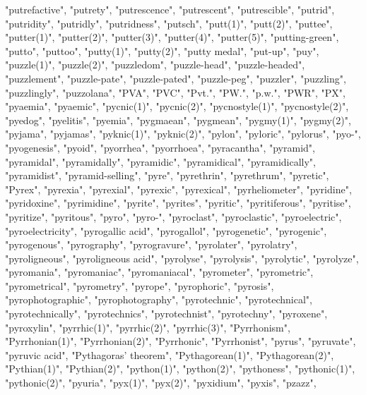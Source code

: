 "putrefactive",
"putrety",
"putrescence",
"putrescent",
"putrescible",
"putrid",
"putridity",
"putridly",
"putridness",
"putsch",
"putt(1)",
"putt(2)",
"puttee",
"putter(1)",
"putter(2)",
"putter(3)",
"putter(4)",
"putter(5)",
"putting-green",
"putto",
"puttoo",
"putty(1)",
"putty(2)",
"putty medal",
"put-up",
"puy",
"puzzle(1)",
"puzzle(2)",
"puzzledom",
"puzzle-head",
"puzzle-headed",
"puzzlement",
"puzzle-pate",
"puzzle-pated",
"puzzle-peg",
"puzzler",
"puzzling",
"puzzlingly",
"puzzolana",
"PVA",
"PVC",
"Pvt.",
"PW.",
"p.w.",
"PWR",
"PX",
"pyaemia",
"pyaemic",
"pycnic(1)",
"pycnic(2)",
"pycnostyle(1)",
"pycnostyle(2)",
"pyedog",
"pyelitis",
"pyemia",
"pygmaean",
"pygmean",
"pygmy(1)",
"pygmy(2)",
"pyjama",
"pyjamas",
"pyknic(1)",
"pyknic(2)",
"pylon",
"pyloric",
"pylorus",
"pyo-",
"pyogenesis",
"pyoid",
"pyorrhea",
"pyorrhoea",
"pyracantha",
"pyramid",
"pyramidal",
"pyramidally",
"pyramidic",
"pyramidical",
"pyramidically",
"pyramidist",
"pyramid-selling",
"pyre",
"pyrethrin",
"pyrethrum",
"pyretic",
"Pyrex",
"pyrexia",
"pyrexial",
"pyrexic",
"pyrexical",
"pyrheliometer",
"pyridine",
"pyridoxine",
"pyrimidine",
"pyrite",
"pyrites",
"pyritic",
"pyritiferous",
"pyritise",
"pyritize",
"pyritous",
"pyro",
"pyro-",
"pyroclast",
"pyroclastic",
"pyroelectric",
"pyroelectricity",
"pyrogallic acid",
"pyrogallol",
"pyrogenetic",
"pyrogenic",
"pyrogenous",
"pyrography",
"pyrogravure",
"pyrolater",
"pyrolatry",
"pyroligneous",
"pyroligneous acid",
"pyrolyse",
"pyrolysis",
"pyrolytic",
"pyrolyze",
"pyromania",
"pyromaniac",
"pyromaniacal",
"pyrometer",
"pyrometric",
"pyrometrical",
"pyrometry",
"pyrope",
"pyrophoric",
"pyrosis",
"pyrophotographic",
"pyrophotography",
"pyrotechnic",
"pyrotechnical",
"pyrotechnically",
"pyrotechnics",
"pyrotechnist",
"pyrotechny",
"pyroxene",
"pyroxylin",
"pyrrhic(1)",
"pyrrhic(2)",
"pyrrhic(3)",
"Pyrrhonism",
"Pyrrhonian(1)",
"Pyrrhonian(2)",
"Pyrrhonic",
"Pyrrhonist",
"pyrus",
"pyruvate",
"pyruvic acid",
"Pythagoras' theorem",
"Pythagorean(1)",
"Pythagorean(2)",
"Pythian(1)",
"Pythian(2)",
"python(1)",
"python(2)",
"pythoness",
"pythonic(1)",
"pythonic(2)",
"pyuria",
"pyx(1)",
"pyx(2)",
"pyxidium",
"pyxis",
"pzazz",

